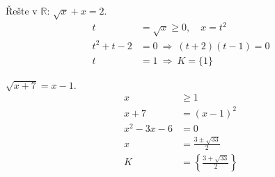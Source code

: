 \documentclass[11pt,a4paper]{article}
\begin{document}
\begin{zadaniReseniBox}[title={Rozšíření 1}]
Řešte v $\mathbb R$: $\sqrt{x}+x=2$.
\tcblower
\[
\begin{aligned}t&=\sqrt x\ge0,\quad x=t^2\\t^2+t-2&=0\ \Rightarrow\ (t+2)(t-1)=0\\t&=1\ \Rightarrow\ K=\{1\}\end{aligned}
\]
\end{zadaniReseniBox}

\begin{zadaniReseniBox}[title={Rozšíření 2}]
$\sqrt{x+7}=x-1$.
\tcblower
\[\begin{aligned}
x&\ge1\\x+7&=(x-1)^2\\x^2-3x-6&=0\\x&=\frac{3\pm\sqrt{33}}2\\K&=\left\{\frac{3+\sqrt{33}}2\right\}
\end{aligned}\]
\end{zadaniReseniBox}
\end{document}
